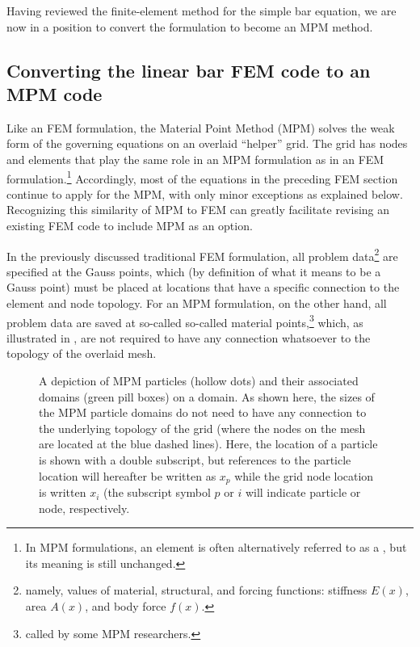 Having reviewed the finite-element method for the simple \oneD bar equation, we are now in a position to convert the formulation to become an MPM method.  

















\subsection{Converting the \oneD linear bar FEM code to an MPM code}
Like an FEM formulation, the Material Point Method (MPM) solves the weak form of the governing equations on an overlaid ``helper'' grid. The grid has nodes and elements that play the same role in an MPM formulation as in an FEM formulation.\footnote{In MPM formulations, an element is often alternatively referred to as a , but its meaning is still unchanged.}  Accordingly, most of the equations in the preceding FEM section continue to apply for the MPM, with only minor exceptions as explained below. Recognizing this similarity of MPM to FEM can greatly facilitate revising an existing FEM code to include MPM as an option.

In the previously discussed traditional FEM formulation, all problem data\footnote{namely, values of material, structural, and forcing functions: stiffness $E(x)$, area $A(x)$, and body force $f(x)$.} are specified at the Gauss points, which (by definition of what it means to be a Gauss point) must be placed at locations that have a specific connection to the element and node topology. For an MPM formulation, on the other hand, all problem data are saved at so-called so-called material points,\footnote{called  by some MPM researchers.} which, as illustrated in , are not required to have any connection whatsoever to the topology of the overlaid mesh.

%
%
%
\begin{figure}[ht]
\caption{A depiction of MPM particles (hollow dots) and their associated domains (green pill boxes) on a \oneD domain.  As shown here, the sizes of the MPM particle domains do not need to have any connection to the underlying topology of the grid (where the nodes on the mesh are located at the blue dashed lines).  Here, the location of a particle is shown with a double subscript, but references to the \pth particle location will hereafter be written as $x_p$ while the \ith grid node location is written $x_i$ (\ie the subscript symbol $p$ or $i$ will indicate particle or node, respectively.}
\label{fig:particlesOnOneDgrid}
\end{figure}
%
%
%

